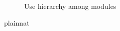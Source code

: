 \documentclass[12pt, titlepage]{article}
\begin{document}
\begin{figure}[H]
\centering
\caption{Use hierarchy among modules}
\label{FigUH}
\end{figure}


 {plainnat}

\end{document}
